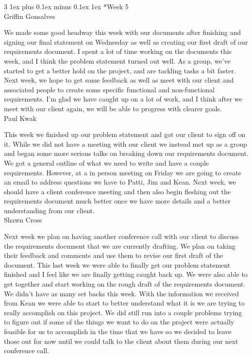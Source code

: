 \documentclass[letterpaper, 10pt, draftclsnofoot, compsoc, onecolumn]{IEEEtran}
\makeatletter
\def\subsubsection{\@startsection{subsubsection}%
                                 {3}%
                                 {\z@}%
                                 {1ex plus 0.1ex minus 0.1ex}%
                                 {1ex}%
                                 {\normalfont\normalsize}}%
\makeatother
\begin{document}
\subsubsection*{Week 5}\hspace*{\fill} \\
Griffin Gonsalves

We made some good headway this week with our documents after finishing and signing our final statement on Wednesday as well as creating our first draft of our requirements document. I spent a lot of time working on the documents this week, and I think the problem statement turned out well. As a group, we've started to get a better hold on the project, and are tackling tasks a bit faster. Next week, we hope to get some feedback as well as meet with our client and associated people to create some specific functional and non-functional requirements. I'm glad we have caught up on a lot of work, and I think after we meet with our client again, we will be able to progress with clearer goals.\\

Paul Kwak

This week we finished up our problem statement and got our client to sign off on it. While we did not have a meeting with our client we instead met up as a group and began some more serious talks on breaking down our requirements document. We got a general outline of what we need to write and have a couple requirements. However, at a in person meeting on Friday we are going to create an email to address questions we have to Patti, Jim and Kean. Next week, we should have a client conference meeting and then also begin fleshing out the requirements document much better once we have more details and a better understanding from our client.\\

Shawn Cross

Next week we plan on having another conference call with our client to discuss the requirements document that we are currently drafting. We plan on taking their feedback and comments and use them to revise our first draft of the document. This last week we were able to finally get our problem statement finished and I feel like we are finally getting caught back up. We were also able to get together and start working on the rough draft of the requirements document. We didn't have as many set backs this week. With the information we received from Kean we were able to start to better understand what it is we are trying to really accomplish on this project. We did still run into a couple problems trying to figure out if some of the things we want to do on the project were actually feasible for us to accomplish in the time that we have so we decided to leave those out for now until we could talk to the client about them during our next conference call.\\
\end{document}
